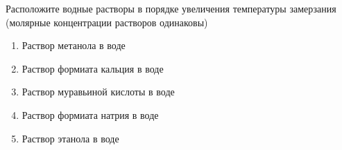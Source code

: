 
Расположите водные растворы в порядке увеличения температуры замерзания (молярные концентрации растворов одинаковы)

\begin{enumerate}
    \item Раствор метанола в воде
    \item Раствор формиата кальция в воде
    \item Раствор муравьиной кислоты в воде
    \item Раствор формиата натрия в воде
    \item Раствор этанола в воде
\end{enumerate}



